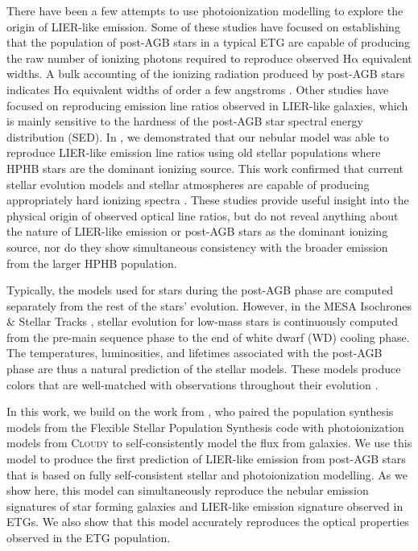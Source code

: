 \documentclass[preprint2]{aastex62}
\newcommand{\FSPS}{{\sc FSPS}\xspace}
\newcommand{\Cloudy}{\textsc{Cloudy}\xspace}
\newcommand{\ha}{\ensuremath{\mathrm{H\alpha}}\xspace}
\begin{document}
There have been a few attempts to use photoionization modelling to explore the origin of LIER-like emission. Some of these studies have focused on establishing that the population of post-AGB stars in a typical ETG are capable of producing the raw number of ionizing photons required to reproduce observed \ha equivalent widths. A bulk accounting of the ionizing radiation produced by post-AGB stars indicates \ha equivalent widths of order a few angstroms \citep{Maraston+2005, CidFernandes+2011, Belfiore+2016,Gomes+2016}. Other studies have focused on reproducing emission line ratios observed in LIER-like galaxies, which is mainly sensitive to the hardness of the post-AGB star spectral energy distribution (SED). In \citet{Byler+2017}, we demonstrated that our nebular model was able to reproduce LIER-like emission line ratios using old stellar populations where HPHB stars are the dominant ionizing source. This work confirmed that current stellar evolution models and stellar atmospheres are capable of producing appropriately hard ionizing spectra \citep[see also][]{Hirschmann+2017}. These studies provide useful insight into the physical origin of observed optical line ratios, but do not reveal anything about the nature of LIER-like emission or post-AGB stars as the dominant ionizing source, nor do they show simultaneous consistency with the broader emission from the larger HPHB population.

Typically, the models used for stars during the post-AGB phase are computed separately from the rest of the stars' evolution. However, in the MESA Isochrones \& Stellar Tracks \citep[MIST; ][]{Dotter+2016, Choi+2016}, stellar evolution for low-mass stars is continuously computed from the pre-main sequence phase to the end of white dwarf (WD) cooling phase. The temperatures, luminosities, and lifetimes associated with the post-AGB phase are thus a natural prediction of the stellar models. These models produce colors that are well-matched with observations throughout their evolution \citep{Choi+2016}.

In this work, we build on the work from \citet{Byler+2017}, who paired the population synthesis models from the Flexible Stellar Population Synthesis code \citep[\FSPS; ][]{Conroy+2009} with photoionization models from \Cloudy \citep{Ferland+2013} to self-consistently model the flux from galaxies. We use this model to produce the first prediction of LIER-like emission from post-AGB stars that is based on fully self-consistent stellar and photoionization modelling. As we show here, this model can simultaneously reproduce the nebular emission signatures of star forming galaxies and LIER-like emission signature observed in ETGs. We also show that this model accurately reproduces the optical properties observed in the ETG population.
\end{document}

